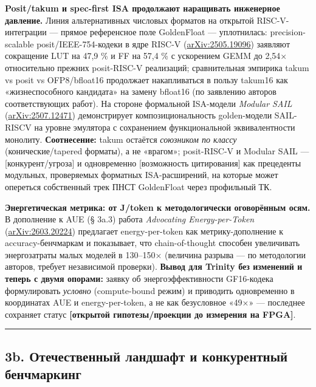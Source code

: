 \documentclass[
  russian,
]{article}
\begin{document}
\textbf{Posit/takum и spec-first ISA продолжают наращивать инженерное
давление.} Линия альтернативных числовых форматов на открытой
RISC-V-интеграции --- прямое референсное поле GoldenFloat ---
уплотнилась: precision-scalable posit/IEEE-754-кодеки в ядре RISC-V
(\href{https://arxiv.org/abs/2505.19096}{arXiv:2505.19096}) заявляют
сокращение LUT на 47,9 \% и FF на 57,4 \% с ускорением GEMM до 2,54×
относительно прежних posit-RISC-V реализаций; сравнительная эмпирика
takum vs posit vs OFP8/bfloat16 продолжает накапливаться в пользу
takum16 как «жизнеспособного кандидата» на замену bfloat16 (по заявлению
авторов соответствующих работ). На стороне формальной ISA-модели
\emph{Modular SAIL}
(\href{https://arxiv.org/abs/2507.12471}{arXiv:2507.12471})
демонстрирует композициональность golden-модели SAIL-RISCV на уровне
эмулятора с сохранением функциональной эквивалентности монолиту.
\textbf{Соотнесение:} takum остаётся \emph{союзником по классу}
(конические/tapered форматы), а не «врагом»; posit-RISC-V и Modular SAIL
--- {[}конкурент/угроза{]} и одновременно {[}возможность цитирования{]}
как прецеденты модульных, проверяемых форматных ISA-расширений, на
которые может опереться собственный трек ПНСТ GoldenFloat через
профильный ТК.

\textbf{Энергетическая метрика: от J/token к методологически оговорённым
осям.} В дополнение к AUE (§ 3a.3) работа \emph{Advocating
Energy-per-Token}
(\href{https://arxiv.org/abs/2603.20224}{arXiv:2603.20224}) предлагает
energy-per-token как метрику-дополнение к accuracy-бенчмаркам и
показывает, что chain-of-thought способен увеличивать энергозатраты
малых моделей в 130--150× (величина разрыва --- по методологии авторов,
требует независимой проверки). \textbf{Вывод для Trinity без изменений и
теперь с двумя опорами:} заявку об энергоэффективности GF16-кодека
формулировать \emph{условно} (compute-bound режим) и приводить
одновременно в координатах AUE и energy-per-token, а не как безусловное
«49×» --- последнее сохраняет статус \textbf{{[}открытой
гипотезы/проекции до измерения на FPGA{]}}.

\begin{center}\rule{0.5\linewidth}{0.5pt}\end{center}

\subsection{3b. Отечественный ландшафт и конкурентный
бенчмаркинг}\label{b.-ux43eux442ux435ux447ux435ux441ux442ux432ux435ux43dux43dux44bux439-ux43bux430ux43dux434ux448ux430ux444ux442-ux438-ux43aux43eux43dux43aux443ux440ux435ux43dux442ux43dux44bux439-ux431ux435ux43dux447ux43cux430ux440ux43aux438ux43dux433}
\end{document}
